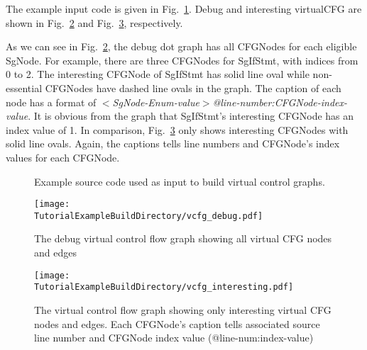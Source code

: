 The example input code is given in
Fig.~\ref{Tutorial:exampleInputCode_virtualCFG}. Debug and interesting virtualCFG 
are shown in Fig.~\ref{tutorial:exampleOutputCodeDebugPDF} and
Fig.~\ref{tutorial:exampleOutputCodeInterestingPDF}, respectively.

As we can see in Fig.~\ref{tutorial:exampleOutputCodeDebugPDF}, the debug
dot graph has all CFGNodes for each eligible SgNode. 
For example, there are three CFGNodes for SgIfStmt, with indices from 0 to
2. The interesting CFGNode of SgIfStmt has solid line oval while
non-essential CFGNodes have dashed line ovals in the graph. 
The caption of each node has a format of
\textit{$<$SgNode-Enum-value$>$@line-number:CFGNode-index-value}. 
It is obvious from the graph that SgIfStmt's interesting CFGNode has an index value of 1. 
In comparison, Fig.~\ref{tutorial:exampleOutputCodeInterestingPDF} only
shows interesting CFGNodes with solid line ovals. Again, the captions tells
line numbers and CFGNode's index values for each CFGNode. 

\begin{figure}[!h]
{\indent
  {\mySmallFontSize


    \begin{latexonly}
    
    \end{latexonly}

    \begin{htmlonly}
    
    \end{htmlonly}

  }
}
\label{Tutorial:exampleInputCode_virtualCFG}
\caption{Example source code used as input to build virtual control graphs.}
\end{figure}

\begin{figure}
\texttt{[image: \\TutorialExampleBuildDirectory/vcfg\_debug.pdf]}
\caption{The debug virtual control flow graph showing all virtual CFG nodes
and edges}
\label{tutorial:exampleOutputCodeDebugPDF}
\end{figure}


\begin{figure}
\texttt{[image: \\TutorialExampleBuildDirectory/vcfg\_interesting.pdf]}
\caption{The virtual control flow graph showing only interesting virtual
CFG nodes and edges. Each CFGNode's caption tells associated source line
number and CFGNode index value (@line-num:index-value)  }
\label{tutorial:exampleOutputCodeInterestingPDF}
\end{figure}
